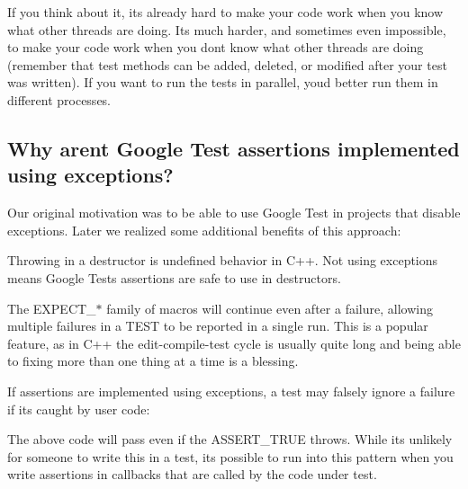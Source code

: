 If you think about it, it\textquotesingle{}s already hard to make your code work when you know what other threads are doing. It\textquotesingle{}s much harder, and sometimes even impossible, to make your code work when you don\textquotesingle{}t know what other threads are doing (remember that test methods can be added, deleted, or modified after your test was written). If you want to run the tests in parallel, you\textquotesingle{}d better run them in different processes.

\subsection*{Why aren\textquotesingle{}t Google Test assertions implemented using exceptions?}

Our original motivation was to be able to use Google Test in projects that disable exceptions. Later we realized some additional benefits of this approach\+:


\begin{DoxyEnumerate}
\item Throwing in a destructor is undefined behavior in C++. Not using exceptions means Google Test\textquotesingle{}s assertions are safe to use in destructors.
\end{DoxyEnumerate}
\begin{DoxyEnumerate}
\item The {\ttfamily E\+X\+P\+E\+C\+T\+\_\+$\ast$} family of macros will continue even after a failure, allowing multiple failures in a {\ttfamily T\+E\+ST} to be reported in a single run. This is a popular feature, as in C++ the edit-\/compile-\/test cycle is usually quite long and being able to fixing more than one thing at a time is a blessing.
\end{DoxyEnumerate}
\begin{DoxyEnumerate}
\item If assertions are implemented using exceptions, a test may falsely ignore a failure if it\textquotesingle{}s caught by user code\+: 
\begin{DoxyCode}{0}
\end{DoxyCode}
 The above code will pass even if the {\ttfamily A\+S\+S\+E\+R\+T\+\_\+\+T\+R\+UE} throws. While it\textquotesingle{}s unlikely for someone to write this in a test, it\textquotesingle{}s possible to run into this pattern when you write assertions in callbacks that are called by the code under test.
\end{DoxyEnumerate}

